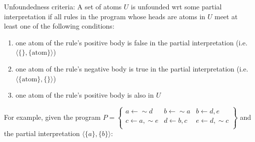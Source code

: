 \documentclass[9pt,a4paper,landscape]{article}
\begin{document}
{Unfoundedness criteria: A set of atoms $U$ is unfounded wrt some partial interpretation if all rules in the program whose heads are atoms in $U$ meet at least one of the following conditions:

\begin{enumerate}[noitemsep, label=(\roman*)]
	\item one atom of the rule's positive body is false in the partial interpretation (i.e.\  $\langle \{\}, \{\text{atom}\} \rangle$)
	\item one atom of the rule's negative body is true in the partial interpretation (i.e.\  $\langle \{\text{atom}\}, \{\} \rangle$)
	\item one atom of the rule's positive body is also in $U$
\end{enumerate}

For example, given the program $P = \left\{\begin{array}{lll}
a \leftarrow {\sim} d & b \leftarrow {\sim} a & b \leftarrow d, e\\
c \leftarrow a, {\sim} e & d \leftarrow b, c & e \leftarrow d, {\sim} c\\
\end{array}\right\}$ and the partial interpretation $\langle \{a\}, \{b\} \rangle$:

}
\end{document}
